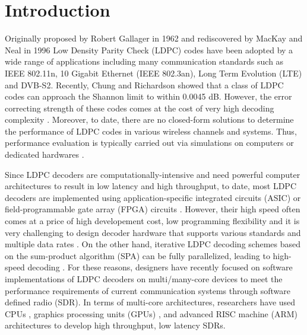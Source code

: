 \documentclass[conference]{IEEEtran}
\begin{document}
\IEEEpeerreviewmaketitle

\section{Introduction}
Originally proposed by Robert Gallager in 1962 \cite{art_gallager} and rediscovered by MacKay and Neal in 1996 \cite{art_macKay} Low Density Parity Check (LDPC) codes have been adopted by a wide range of applications including many communication standards such as IEEE 802.11n, 10 Gigabit Ethernet (IEEE 802.3an), Long Term Evolution (LTE) and DVB-S2. Recently, Chung and Richardson \cite{art_shannon} showed that a class of LDPC codes can approach the Shannon limit to within 0.0045 dB. However, the error correcting strength of these codes comes at the cost of very high decoding complexity \cite{art_ldpc_cpu1}. Moreover, to date, there are no closed-form solutions to determine the performance of LDPC codes in various wireless channels and systems. Thus, performance evaluation is typically carried out via simulations on computers or dedicated hardwares \cite{art_memory_coalesced}.

Since LDPC decoders are computationally-intensive and need powerful computer architectures to result in low latency and high throughput, to date, most LDPC decoders are implemented using application-specific integrated circuits (ASIC) or field-programmable gate array (FPGA) circuits \cite{art_ldpc_OpenCl_1}. However, their high speed often comes at a price of high developement cost, low programming flexibility \cite{art_convolutional} and it is very challenging to design decoder hardware that supports various standards and multiple data rates \cite{art_cuda_openmp}. On the other hand, iterative LDPC decoding schemes based on the sum-product algorithm (SPA) can be fully parallelized, leading to high-speed decoding \cite{art_shannon}. For these reasons, designers have recently focused on software implementations of LDPC decoders on multi/many-core devices \cite{art_massively} to meet the performance requirements of current communication systems through software defined radio (SDR). In terms of multi-core architectures, researchers have used CPUs \cite{art_cpu_gpu, art_ldpc_cpu0}, graphics processing units (GPUs) \cite{art_memory_coalesced, art_massively, art_optimize_0}, and advanced RISC machine (ARM) \cite{art_ldpc_cpu0, art_neon} architectures to develop high throughput, low latency SDRs. 
\end{document}

